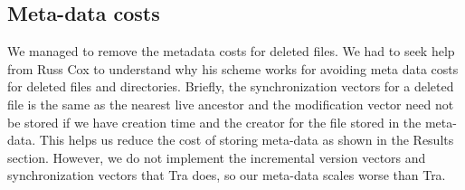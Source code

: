 \subsection{Meta-data costs}
We managed to remove the metadata costs for deleted files. We had to seek help from Russ Cox to understand why his scheme works for avoiding meta data costs for deleted files and directories. Briefly, the synchronization vectors for a deleted file is the same as the nearest live ancestor and the modification vector need not be stored if we have creation time and the creator for the file stored in the meta-data. This helps us reduce the cost of storing meta-data as shown in the Results section. However, we do not implement the incremental version vectors and synchronization vectors that Tra does, so our meta-data scales worse than Tra.

